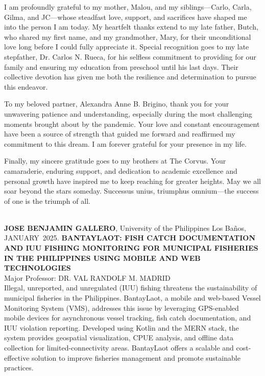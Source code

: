 \documentclass{icsthesis}
\renewcommand{\AUTHOR}{JOSE BENJAMIN GALLERO}
\renewcommand{\MONTH}{JANUARY}
\renewcommand{\YEAR}{2025}
\begin{document}
\begin{frontmatter}
\begin{acknowledgement}
            I am profoundly grateful to my mother, Malou, and my siblings—Carlo, Carla, Gilma, and JC—whose steadfast love, support, and sacrifices have shaped me into the person I am today. My heartfelt thanks extend to my late father, Butch, who shared my first name, and my grandmother, Mary, for their unconditional love long before I could fully appreciate it. Special recognition goes to my late stepfather, Dr. Carlos N. Rueca, for his selfless commitment to providing for our family and ensuring my education from preschool until his last days. Their collective devotion has given me both the resilience and determination to pursue this endeavor.
    
            To my  beloved partner, Alexandra Anne B. Brigino, thank you for your unwavering patience and understanding, especially during the most challenging moments brought about by the pandemic. Your love and constant encouragement have been a source of strength that guided me forward and reaffirmed my commitment to this dream. I am forever grateful for your presence in my life.
    
            Finally, my sincere gratitude goes to my brothers at The Corvus. Your camaraderie, enduring support, and dedication to academic excellence and personal growth have inspired me to keep reaching for greater heights. May we all soar beyond the stars someday. Successus unius, triumphus omnium—the success of one is the triumph of all.
		\end{acknowledgement}
		
		\maketableofcontents
		
		\makelistoftables

		\makelistoffigures
	
		
		\begin{abstractwithpageno}	
		\\
		\textbf{\AUTHOR}, University of the Philippines Los Ba\~{n}os, \MONTH\ \YEAR. \textbf{BANTAYLAOT: FISH CATCH DOCUMENTATION AND IUU FISHING \- MONITORING FOR MUNICIPAL FISHERIES IN THE PHILIPPINES USING \- MOBILE AND WEB TECHNOLOGIES}
		\\Major Professor: DR. VAL RANDOLF M. MADRID\\
			
			Illegal, unreported, and unregulated (IUU) fishing threatens the sustainability of municipal fisheries in the Philippines. BantayLaot, a mobile and web-based Vessel Monitoring System (VMS), addresses this issue by leveraging GPS-enabled mobile devices for asynchronous vessel tracking, fish catch documentation, and IUU violation reporting. Developed using Kotlin and the MERN stack, the system provides geospatial visualization, CPUE analysis, and offline data collection for limited-connectivity areas. BantayLaot offers a scalable and cost-effective solution to improve fisheries management and promote sustainable practices.
		\end{abstractwithpageno}

	\end{frontmatter}
	
\end{document}
